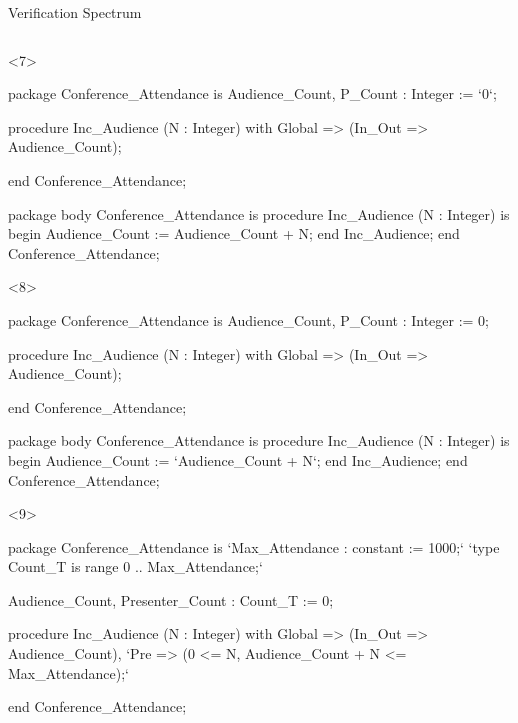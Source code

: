 \documentclass{beamer}
\begin{document}
\begin{frame}[fragile]{Verification Spectrum}
\begin{columns}
\begin{column}{9cm}
      \begin{onlyenv}<7>
      \begin{pxcode}[language=SPARK,style=magic,gobble=8]
        package Conference_Attendance
        is
           Audience_Count, P_Count : Integer := `0`;

           procedure Inc_Audience (N : Integer)
           with Global => (In_Out => Audience_Count);

        end Conference_Attendance;

        package body Conference_Attendance
        is
           procedure Inc_Audience (N : Integer)
           is
           begin
              Audience_Count := Audience_Count + N;
           end Inc_Audience;
        end Conference_Attendance;
      \end{pxcode}
      \end{onlyenv}

      \begin{onlyenv}<8>
      \begin{pxcode}[language=SPARK,style=magic,gobble=8]
        package Conference_Attendance
        is
           Audience_Count, P_Count : Integer := 0;

           procedure Inc_Audience (N : Integer)
           with Global => (In_Out => Audience_Count);

        end Conference_Attendance;

        package body Conference_Attendance
        is
           procedure Inc_Audience (N : Integer)
           is
           begin
              Audience_Count := `Audience_Count + N`;
           end Inc_Audience;
        end Conference_Attendance;
      \end{pxcode}
      \end{onlyenv}

      \begin{onlyenv}<9>
      \begin{pxcode}[language=SPARK,style=magic,gobble=8]
        package Conference_Attendance
        is
           `Max_Attendance : constant := 1000;`
           `type Count_T is range 0 .. Max_Attendance;`

           Audience_Count, Presenter_Count : Count_T := 0;

           procedure Inc_Audience (N : Integer)
           with Global => (In_Out => Audience_Count),
                `Pre    => (0 <= N, Audience_Count + N <= Max_Attendance);`

        end Conference_Attendance;


\end{pxcode}
\end{onlyenv}
\end{column}
\end{columns}
\end{frame}
\end{document}

